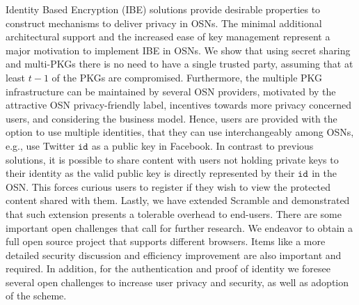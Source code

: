 \documentclass{llncs}
\newcommand{\id}[1]{\ensuremath{\mathtt{id}_{#1}}}
\begin{document}
Identity Based Encryption (IBE) solutions provide desirable properties to construct mechanisms to deliver privacy in OSNs. The minimal
additional architectural support and the increased ease of key management represent a major motivation to implement IBE in OSNs. We show that using secret sharing and multi-PKGs there is no need to have a single trusted party, assuming that at least $t-1$ of the PKGs are compromised. 
Furthermore, the multiple PKG infrastructure can be maintained by several OSN providers, motivated by the attractive OSN privacy-friendly label, incentives towards more privacy concerned users, and considering the business model. 
Hence, users are provided with the option to use multiple identities, that they can use interchangeably among OSNs, e.g., use Twitter \id{} as a public key in Facebook. 
In contrast to previous solutions, it is possible to share content with users not holding private keys to their identity as the valid public key is directly represented by their \id{} in the OSN. This forces curious users to register if they wish to view the protected content shared with them.
Lastly, we have extended Scramble and demonstrated that such extension presents a tolerable overhead to end-users. 
There are some important open challenges that call for further research. We endeavor to obtain a full open source project that supports different browsers. Items like a more detailed security discussion and efficiency improvement are also important and required. In addition, for the authentication and proof of identity we foresee several open challenges to increase user privacy and security, as well as adoption of the scheme.



\end{document}
